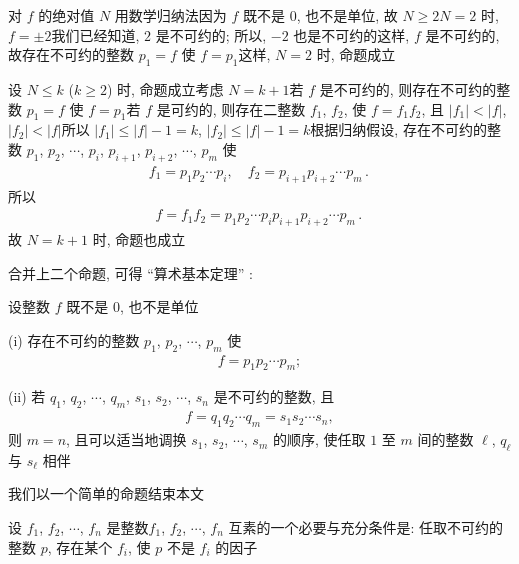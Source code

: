 \begin{pf}
    对 $f$ 的绝对值 $N$ 用数学归纳法\period 因为 $f$ 既不是 $0$, 也不是单位, 故 $N \geq 2$\period $N = 2$ 时, $f = \pm 2$\period 我们已经知道, $2$ 是不可约的; 所以, $-2$ 也是不可约的\period 这样, $f$ 是不可约的, 故存在不可约的整数 $p_1 = f$ 使 $f = p_1$\period 这样, $N = 2$ 时, 命题成立\period

    设 $N \leq k$ ($k \geq 2$) 时, 命题成立\period 考虑 $N = k+1$\period 若 $f$ 是不可约的, 则存在不可约的整数 $p_1 = f$ 使 $f = p_1$\period 若 $f$ 是可约的, 则存在二整数 $f_1$, $f_2$, 使 $f = f_1 f_2$, 且 $|f_1| < |f|$, $|f_2| < |f|$\period 所以 $|f_1| \leq |f| - 1 = k$, $|f_2| \leq |f| - 1 = k$\period 根据归纳假设, 存在不可约的整数 $p_1$, $p_2$, $\cdots$, $p_i$, $p_{i+1}$, $p_{i+2}$, $\cdots$, $p_m$ 使
    \begin{align*}
        f_1 = p_1 p_2 \cdots p_i, \quad f_2 = p_{i+1} p_{i+2} \cdots p_m \period
    \end{align*}
    所以
    \begin{align*}
        f = f_1 f_2 = p_1 p_2 \cdots p_i p_{i+1} p_{i+2} \cdots p_m \period
    \end{align*}
    故 $N = k+1$ 时, 命题也成立\period
\end{pf}

合并上二个命题, 可得 ``算术基本定理'' :
\begin{proposition}
    设整数 $f$ 既不是 $0$, 也不是单位\period

    (i) 存在不可约的整数 $p_1$, $p_2$, $\cdots$, $p_m$ 使
    \begin{align*}
        f = p_1 p_2 \cdots p_m;
    \end{align*}

    (ii) 若 $q_1$, $q_2$, $\cdots$, $q_m$, $s_1$, $s_2$, $\cdots$, $s_n$ 是不可约的整数, 且
    \begin{align*}
        f = q_1 q_2 \cdots q_m = s_1 s_2 \cdots s_n,
    \end{align*}
    则 $m = n$, 且可以适当地调换 $s_1$, $s_2$, $\cdots$, $s_m$ 的顺序, 使任取 $1$ 至 $m$ 间的整数 $\ell$, $q_\ell$ 与 $s_\ell$ 相伴\period
\end{proposition}

我们以一个简单的命题结束本文\period

\begin{proposition}
    设 $f_1$, $f_2$, $\cdots$, $f_n$ 是整数\period $f_1$, $f_2$, $\cdots$, $f_n$ 互素的一个必要与充分条件是: 任取不可约的整数 $p$, 存在某个 $f_i$, 使 $p$ 不是 $f_i$ 的因子\period
\end{proposition}

